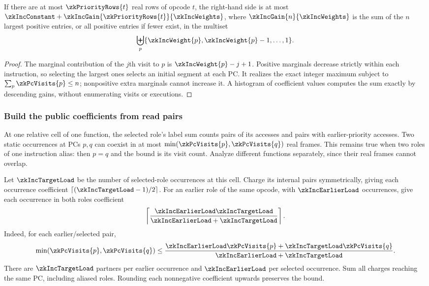 \begin{lemma}\label{lem:zk-incidence-conjugate}
If there are at most $\zkPriorityRows{t}$ real rows of opcode $t$, the right-hand side is at most $\zkIncConstant+\zkIncGain{\zkPriorityRows{t}}{\zkIncWeights}$, where $\zkIncGain{n}{\zkIncWeights}$ is the sum of the $n$ largest positive entries, or all positive entries if fewer exist, in the multiset
\[
 \biguplus_p\{\zkIncWeight{p},\zkIncWeight{p}-1,\ldots,1\}.
\]
\end{lemma}
\begin{proof}
The marginal contribution of the $j$th visit to $p$ is $\zkIncWeight{p}-j+1$. Positive marginals decrease strictly within each instruction, so selecting the largest ones selects an initial segment at each PC. It realizes the exact integer maximum subject to $\sum_p\zkPcVisits{p}\le n$; nonpositive extra marginals cannot increase it. A histogram of coefficient values computes the sum exactly by descending gains, without enumerating visits or executions.
\end{proof}

\subsubsection{Build the public coefficients from read pairs}

At one relative cell of one function, the selected role's label sum counts pairs of its accesses and pairs with earlier-priority accesses. Two static occurrences at PCs $p,q$ can coexist in at most $\min(\zkPcVisits{p},\zkPcVisits{q})$ real frames. This remains true when two roles of one instruction alias: then $p=q$ and the bound is its visit count. Analyze different functions separately, since their real frames cannot overlap.

Let $\zkIncTargetLoad$ be the number of selected-role occurrences at this cell. Charge its internal pairs symmetrically, giving each occurrence coefficient $\lceil(\zkIncTargetLoad-1)/2\rceil$. For an earlier role of the same opcode, with $\zkIncEarlierLoad$ occurrences, give each occurrence in both roles coefficient
\[
 \left\lceil\frac{\zkIncEarlierLoad\zkIncTargetLoad}{\zkIncEarlierLoad+\zkIncTargetLoad}\right\rceil.
\]
Indeed, for each earlier/selected pair,
\[
 \min(\zkPcVisits{p},\zkPcVisits{q})
 \le\frac{\zkIncEarlierLoad\zkPcVisits{p}+\zkIncTargetLoad\zkPcVisits{q}}{\zkIncEarlierLoad+\zkIncTargetLoad}.
\]
There are $\zkIncTargetLoad$ partners per earlier occurrence and $\zkIncEarlierLoad$ per selected occurrence. Sum all charges reaching the same PC, including aliased roles. Rounding each nonnegative coefficient upwards preserves the bound.

